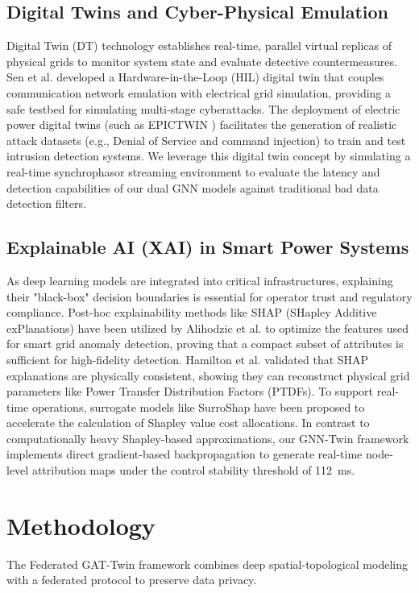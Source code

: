 \documentclass[10pt, a4paper, twocolumn]{article}
\begin{document}
\subsection{Digital Twins and Cyber-Physical Emulation}
Digital Twin (DT) technology establishes real-time, parallel virtual replicas of physical grids to monitor system state and evaluate detective countermeasures. Sen et al. \cite{sen_dt_countermeasures} developed a Hardware-in-the-Loop (HIL) digital twin that couples communication network emulation with electrical grid simulation, providing a safe testbed for simulating multi-stage cyberattacks. The deployment of electric power digital twins (such as EPICTWIN \cite{sen_epictwin}) facilitates the generation of realistic attack datasets (e.g., Denial of Service and command injection) to train and test intrusion detection systems. We leverage this digital twin concept by simulating a real-time synchrophasor streaming environment to evaluate the latency and detection capabilities of our dual GNN models against traditional bad data detection filters.

\subsection{Explainable AI (XAI) in Smart Power Systems}
As deep learning models are integrated into critical infrastructures, explaining their "black-box" decision boundaries is essential for operator trust and regulatory compliance. Post-hoc explainability methods like SHAP (SHapley Additive exPlanations) have been utilized by Alihodzic et al. \cite{alihodzic_shap} to optimize the features used for smart grid anomaly detection, proving that a compact subset of attributes is sufficient for high-fidelity detection. Hamilton et al. \cite{hamilton_shap} validated that SHAP explanations are physically consistent, showing they can reconstruct physical grid parameters like Power Transfer Distribution Factors (PTDFs). To support real-time operations, surrogate models like SurroShap \cite{feng_surroshap} have been proposed to accelerate the calculation of Shapley value cost allocations. In contrast to computationally heavy Shapley-based approximations, our GNN-Twin framework implements direct gradient-based backpropagation to generate real-time node-level attribution maps under the control stability threshold of 112~ms.

\section{Methodology}
The Federated GAT-Twin framework combines deep spatial-topological modeling with a federated protocol to preserve data privacy.
\end{document}
